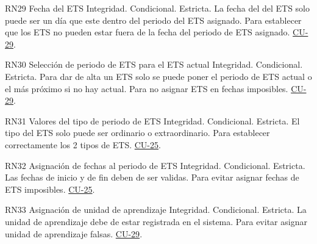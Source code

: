 \begin{BussinesRule}{RN29} {Fecha del ETS}
    \BRitem[Tipo:]Integridad.
    \BRitem[Clase:]Condicional.
    \BRitem[Nivel:] Estricta.
    \BRitem[Descripción:] La fecha del del ETS solo puede ser un día que este dentro del periodo del ETS asignado.
    \BRitem[Motivación:] Para establecer que los ETS no pueden estar fuera de la fecha del periodo de ETS asignado.
     \hyperlink{CU-29}{CU-29}.
    \end{BussinesRule}

\begin{BussinesRule}{RN30} {Selección de periodo de ETS para el ETS actual}
    \BRitem[Tipo:]Integridad.
    \BRitem[Clase:]Condicional.
    \BRitem[Nivel:] Estricta.
    \BRitem[Descripción:] Para dar de alta un ETS solo se puede poner el periodo de ETS actual o el más próximo si no hay actual.
    \BRitem[Motivación:] Para no asignar ETS en fechas imposibles.
     \hyperlink{CU-29}{CU-29}.
    \end{BussinesRule}


\begin{BussinesRule}{RN31} {Valores del tipo de periodo de ETS}
    \BRitem[Tipo:]Integridad.
    \BRitem[Clase:]Condicional.
    \BRitem[Nivel:] Estricta.
    \BRitem[Descripción:] El tipo del ETS solo puede ser ordinario o extraordinario.
    \BRitem[Motivación:] Para establecer correctamente los 2 tipos de ETS.
     \hyperlink{CU-25}{CU-25}.
    \end{BussinesRule}

\begin{BussinesRule}{RN32} {Asignación de fechas al periodo de ETS}
    \BRitem[Tipo:]Integridad.
    \BRitem[Clase:]Condicional.
    \BRitem[Nivel:] Estricta.
    \BRitem[Descripción:] Las fechas de inicio y de fin deben de ser validas.
    \BRitem[Motivación:] Para evitar asignar fechas de ETS imposibles.
     \hyperlink{CU-25}{CU-25}.
    \end{BussinesRule}

\begin{BussinesRule}{RN33} {Asignación de unidad de aprendizaje}
    \BRitem[Tipo:]Integridad.
    \BRitem[Clase:]Condicional.
    \BRitem[Nivel:] Estricta.
    \BRitem[Descripción:] La unidad de aprendizaje debe de estar registrada en el sistema.
    \BRitem[Motivación:] Para evitar asignar unidad de aprendizaje falsas.
     \hyperlink{CU-29}{CU-29}.
    \end{BussinesRule}

